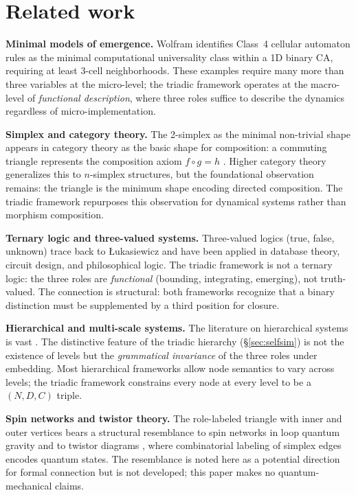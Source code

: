 \documentclass[12pt]{article}
\theoremstyle{definition}
\theoremstyle{remark}
\begin{document}
\section{Related work}\label{sec:related}

\textbf{Minimal models of emergence.}  Wolfram \cite{Wol02} identifies Class~4 cellular
automaton rules as the minimal computational universality class within a 1D binary CA,
requiring at least 3-cell neighborhoods.  These examples require many more than three
variables at the micro-level; the triadic framework operates at the macro-level of
\emph{functional description}, where three roles suffice to describe the dynamics
regardless of micro-implementation.

\textbf{Simplex and category theory.}  The 2-simplex as the minimal non-trivial shape
appears in category theory as the basic shape for composition: a commuting triangle
represents the composition axiom $f \circ g = h$ \cite{MacLane98}.  Higher category
theory generalizes this to $n$-simplex structures, but the foundational observation
remains: the triangle is the minimum shape encoding directed composition.  The triadic
framework repurposes this observation for dynamical systems rather than morphism
composition.

\textbf{Ternary logic and three-valued systems.}  Three-valued logics (true, false,
unknown) trace back to {\L}ukasiewicz \cite{Luk20} and have been applied in database
theory, circuit design, and philosophical logic.  The triadic framework is not a ternary
logic: the three roles are \emph{functional} (bounding, integrating, emerging), not
truth-valued.  The connection is structural: both frameworks recognize that a binary
distinction must be supplemented by a third position for closure.

\textbf{Hierarchical and multi-scale systems.}  The literature on hierarchical systems
is vast \cite{Sim62,Koe69,Sal12}.  The distinctive feature of the triadic hierarchy
(\S\ref{sec:selfsim}) is not the existence of levels but the \emph{grammatical
invariance} of the three roles under embedding.  Most hierarchical frameworks allow
node semantics to vary across levels; the triadic framework constrains every node at
every level to be a $(N, D, C)$ triple.

\textbf{Spin networks and twistor theory.}  The role-labeled triangle with inner and
outer vertices bears a structural resemblance to spin networks in loop quantum gravity
\cite{RS94} and to twistor diagrams \cite{Pen67}, where combinatorial labeling of
simplex edges encodes quantum states.  The resemblance is noted here as a potential
direction for formal connection but is not developed; this paper makes no
quantum-mechanical claims.
\end{document}
